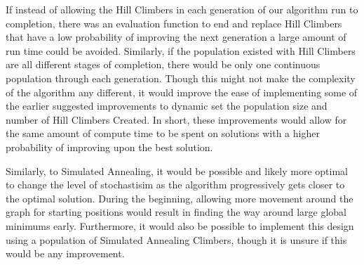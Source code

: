 \documentclass[sigplan,screen]{acmart}
\begin{document}
If instead of allowing the Hill Climbers in each generation of our algorithm run
to completion, there was an evaluation function to end and replace Hill Climbers
that have a low probability of improving the next generation a large amount of
run time could be avoided. Similarly, if the population existed with Hill
Climbers are all different stages of completion, there would be only one
continuous population through each generation. Though this might not make the
complexity of the algorithm any different, it would improve the ease of
implementing some of the earlier suggested improvements to dynamic set the
population size and number of Hill Climbers Created. In short, these
improvements would allow for the same amount of compute time to be spent on
solutions with a higher probability of improving upon the best solution.

Similarly, to Simulated Annealing, it would be possible and likely more optimal
to change the level of stochastisim as the algorithm progressively gets closer
to the optimal solution. During the beginning, allowing more movement around the
graph for starting positions would result in finding the way around large global
minimums early. Furthermore, it would also be possible to implement this design
using a population of Simulated Annealing Climbers, though it is unsure if this
would be any improvement.



\end{document}
